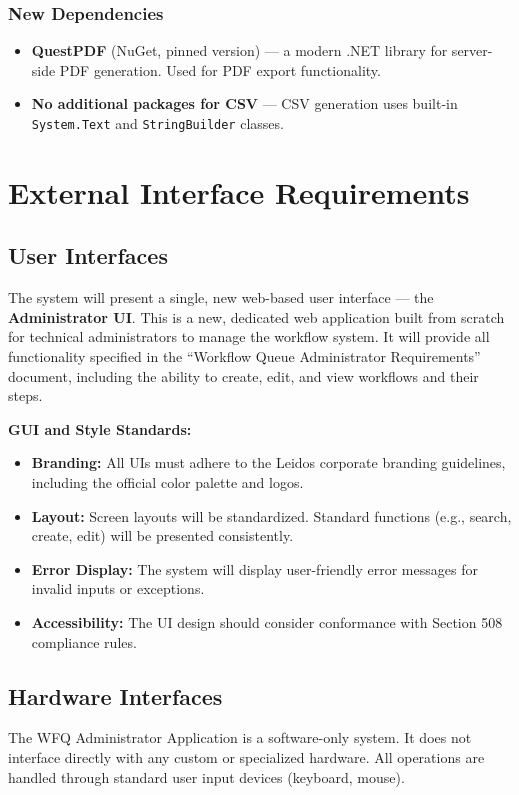 \documentclass[12pt]{article}
\begin{document}
\subsubsection{New Dependencies}
\begin{itemize}
    \item \textbf{QuestPDF} (NuGet, pinned version) --- a modern .NET library for
    server-side PDF generation. Used for PDF export functionality.
    \item \textbf{No additional packages for CSV} --- CSV generation uses built-in
    \texttt{System.Text} and \texttt{StringBuilder} classes.
\end{itemize}

\section{External Interface Requirements}

\subsection{User Interfaces}
The system will present a single, new web-based user interface — the \textbf{Administrator UI}.
This is a new, dedicated web application built from scratch for technical administrators to
manage the workflow system. It will provide all functionality specified in the ``Workflow Queue
Administrator Requirements'' document, including the ability to create, edit, and view
workflows and their steps.

\textbf{GUI and Style Standards:}
\begin{itemize}
    \item \textbf{Branding:} All UIs must adhere to the Leidos corporate branding guidelines,
    including the official color palette and logos.
    \item \textbf{Layout:} Screen layouts will be standardized. Standard functions (e.g.,
    search, create, edit) will be presented consistently.
    \item \textbf{Error Display:} The system will display user-friendly error messages for
    invalid inputs or exceptions.
    \item \textbf{Accessibility:} The UI design should consider conformance with Section 508
    compliance rules.
\end{itemize}

\subsection{Hardware Interfaces}
The WFQ Administrator Application is a software-only system. It does not interface directly
with any custom or specialized hardware. All operations are handled through standard user
input devices (keyboard, mouse).
\end{document}

